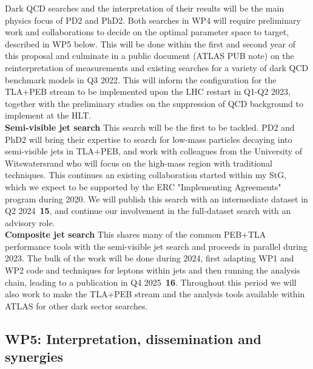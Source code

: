 Dark QCD searches and the interpretation of their results will be the main physics focus of PD2 and PhD2. 
Both searches in WP4 will require preliminary work and collaborations to decide on the optimal parameter space to target, described in WP5 below. 
This will be done within the first and second year of this proposal and culminate in a public document (ATLAS PUB note) on the reinterpretation of measurements and existing searches for a variety of dark QCD benchmark models in Q3 2022. 
This will inform the configuration for the TLA+PEB stream to be implemented upon the LHC restart in Q1-Q2 2023, 
together with the preliminary studies on the suppression of QCD background to implement at the HLT. \\
\textbf{Semi-visible jet search} This search will be the first to be tackled.
PD2 and PhD2 will bring their expertise to search for low-mass particles decaying into semi-visible jets in TLA+PEB, and work with colleagues from the University of Witswatersrand who will focus on the high-mass region with traditional techniques. 
This continues an existing collaboration started within my StG, which we expect to be supported by the ERC "Implementing Agreements" program during 2020.
We will publish this search with an intermediate dataset in Q2 2024~\textbf{15}, and continue our involvement in the full-dataset search with an advisory role. \\
\textbf{Composite jet search} This shares many of the common PEB+TLA performance tools with the semi-visible jet search and proceeds in parallel during 2023. 
The bulk of the work will be done during 2024, first adapting WP1 and WP2 code and techniques for leptons within jets and then running the analysis chain, leading to a publication in Q4 2025~\textbf{16}. 
Throughout this period we will also work to make the TLA+PEB stream and the analysis tools available within ATLAS for other dark sector searches. 

\subsection{WP5: Interpretation, dissemination and synergies}

